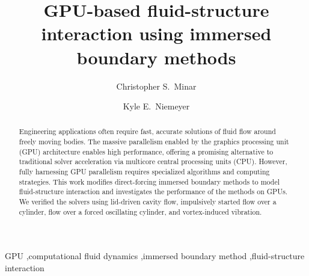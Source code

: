 \documentclass[preprint,12pt]{elsarticle}
\begin{document}
\begin{frontmatter}



\title{GPU-based fluid-structure interaction using immersed boundary methods}


\author[osu]{Christopher S.~Minar}
\author[osu]{Kyle E.~Niemeyer}

\address[osu]{School of Mechanical, Industrial, and Manufacturing Engineering\\
              Oregon State University, Corvallis, OR 97331-6001, USA
              }


\begin{abstract}
    Engineering applications often require fast, accurate solutions of fluid flow around freely
    moving bodies. The massive parallelism enabled by the graphics processing unit (GPU) architecture
    enables high performance, offering a promising alternative to traditional solver acceleration
    via multicore central processing units (CPU). However, fully harnessing GPU parallelism
    requires specialized algorithms and computing strategies. This work modifies direct-forcing
    immersed boundary methods to model fluid-structure interaction and investigates the performance
    of the methods on GPUs. We verified the solvers using lid-driven cavity flow, impulsively started
    flow over a cylinder, flow over a forced oscillating cylinder, and vortex-induced vibration.
\end{abstract}

\begin{keyword}
    GPU \sep computational fluid dynamics \sep immersed boundary method \sep fluid-structure interaction
\end{keyword}

\end{frontmatter}
\end{document}
